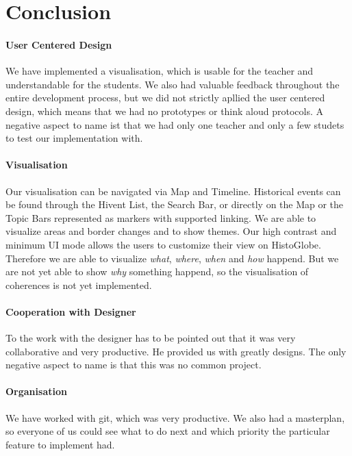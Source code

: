 \section{Conclusion} %
\label{sec:conclusion}

\paragraph{User Centered Design} %
We have implemented a visualisation, which is usable for the teacher and understandable for the students. We also had valuable feedback throughout the entire development process, but we did not strictly apllied the user centered design, which means that we had no prototypes or think aloud protocols. A negative aspect to name ist that we had only one teacher and only a few studets to test our implementation with.

\paragraph{Visualisation} %
Our visualisation can be navigated via Map and Timeline. Historical events can be found through the Hivent List, the Search Bar, or directly on the Map or the Topic Bars represented as markers with supported linking. We are able to visualize areas and border changes and to show themes. Our high contrast and minimum UI mode allows the users to customize their view on HistoGlobe. Therefore we are able to visualize \textit{what}, \textit{where}, \textit{when} and \textit{how} happend. But we are not yet able to show \textit{why} something happend, so the visualisation of coherences is not yet implemented.

\paragraph{Cooperation with Designer} %
To the work with the designer has to be pointed out that it was very collaborative and very productive. He provided us with greatly designs. The only negative aspect to name is that this was no common project. %

\paragraph{Organisation} %
We have worked with git, which was very productive. We also had a masterplan, so everyone of us could see what to do next and which priority the particular feature to implement had. 

